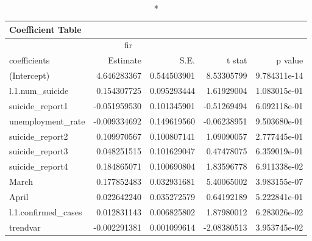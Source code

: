 \begin{longtable}{lrrrr}
\caption*{
{\large Coefficient Table}
} \\ 
\toprule
\multicolumn{4}{c}{fir} &  \\ 
\cmidrule(lr){1-4}
coefficients & Estimate & S.E. & t stat & p value \\ 
\midrule
(Intercept) & 4.646283367 & 0.544503901 & 8.53305799 & 9.784311e-14 \\ 
l.1.num\_suicide & 0.154307725 & 0.095293444 & 1.61929004 & 1.083015e-01 \\ 
suicide\_report1 & -0.051959530 & 0.101345901 & -0.51269494 & 6.092118e-01 \\ 
unemployment\_rate & -0.009334692 & 0.149619560 & -0.06238951 & 9.503680e-01 \\ 
suicide\_report2 & 0.109970567 & 0.100807141 & 1.09090057 & 2.777445e-01 \\ 
suicide\_report3 & 0.048251515 & 0.101629047 & 0.47478075 & 6.359019e-01 \\ 
suicide\_report4 & 0.184865071 & 0.100690804 & 1.83596778 & 6.911338e-02 \\ 
March & 0.177852483 & 0.032931681 & 5.40065002 & 3.983155e-07 \\ 
April & 0.022642240 & 0.035272579 & 0.64192189 & 5.222841e-01 \\ 
l.1.confirmed\_cases & 0.012831143 & 0.006825802 & 1.87980012 & 6.283026e-02 \\ 
trendvar & -0.002291381 & 0.001099614 & -2.08380513 & 3.953745e-02 \\ 
\bottomrule
\end{longtable}

